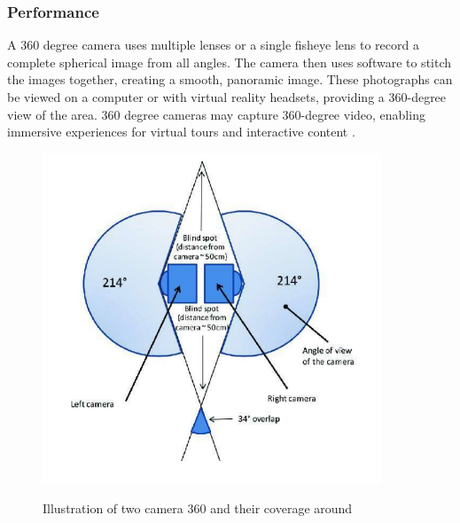 \subsubsection{Performance}
A 360 degree camera uses multiple lenses or a single fisheye lens to record a complete spherical image from all angles. 
The camera then uses software to stitch the images together, creating a 
smooth, panoramic image. These photographs can be viewed on a computer or with virtual reality headsets, providing a 360-degree view of the area. 360 degree cameras may capture 360-degree video, enabling immersive experiences for virtual tours and interactive content \cite{Thebest360camerasin2024}.
   
\begin{figure}[H]
  \centering
  \includegraphics[width=0.9\textwidth]{Figures/360 camera coverage.PNG}
  \caption[Illustration of two camera 360 coverage]{Illustration of two camera 360 and their coverage around} \cite{karkhanis2023complete}
  \label{fig:360 camera coverage}
\end{figure}

